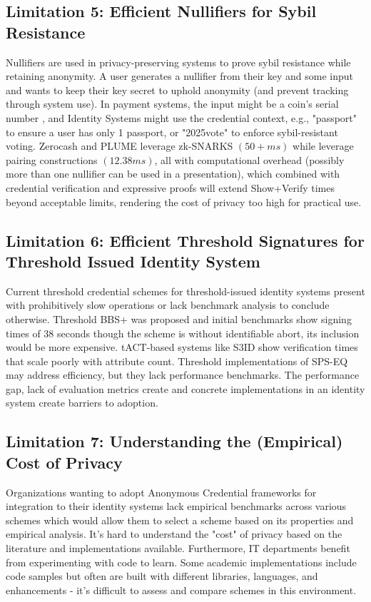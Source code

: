\subsection{Limitation 5: Efficient Nullifiers for Sybil Resistance}
Nullifiers are used in privacy-preserving systems to prove sybil resistance while retaining anonymity. A user generates a nullifier from their key and some input and wants to keep their key secret to uphold anonymity (and prevent tracking through system use). In payment systems, the input might be a coin's serial number \cite{ben_sasson_zerocash_2014, tomescu_utt_2022}, and Identity Systems might use the credential context, e.g., "passport" to ensure a user has only 1 passport, or "2025vote" to enforce sybil-resistant voting. Zerocash \cite{ben_sasson_zerocash_2014} and PLUME \cite{gupta_plume_2022} leverage zk-SNARKS $(50+ms)$ while \cite{tomescu_utt_2022} leverage pairing constructions $(12.38ms)$, all with computational overhead (possibly more than one nullifier can be used in a presentation), which combined with credential verification and expressive proofs will extend Show+Verify times beyond acceptable limits, rendering the cost of privacy too high for practical use. 


\subsection{Limitation 6: Efficient Threshold Signatures for Threshold Issued Identity System}
Current threshold credential schemes for threshold-issued identity systems present with prohibitively slow operations or lack benchmark analysis to conclude otherwise. Threshold BBS+ was proposed \cite{doerner_threshold_2023} and initial benchmarks show signing times of 38 seconds \cite{dock_network_crypto_2025} though the scheme is without identifiable abort, its inclusion would be more expensive. tACT-based systems like S3ID \cite{rabaninejad_attribute-based_2024} show verification times that scale poorly with attribute count. Threshold implementations of SPS-EQ \cite{steinfeld_threshold_2023} may address efficiency, but they lack performance benchmarks. The performance gap, lack of evaluation metrics create and concrete implementations in an identity system create barriers to adoption. 


\subsection{Limitation 7: Understanding the (Empirical) Cost of Privacy}
Organizations wanting to adopt Anonymous Credential frameworks for integration to their identity systems lack empirical benchmarks across various schemes which would allow them to select a scheme based on its properties and empirical analysis. It's hard to understand the "cost" of privacy based on the literature and implementations available. Furthermore, IT departments benefit from experimenting with code to learn. Some academic implementations include code samples but often are built with different libraries, languages, and enhancements - it's difficult to assess and compare schemes in this environment. 


